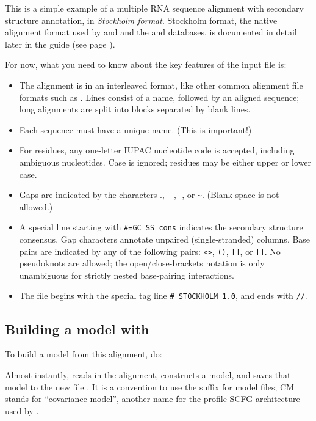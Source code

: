 This is a simple example of a multiple RNA sequence alignment with
secondary structure annotation, in \emph{Stockholm format}. Stockholm
format, the native alignment format used by  and
 and the  and 
databases, is documented in detail later in the guide (see page
\pageref{pg:stockholm}). 

For now, what you need to know about the key features of the input file is:
\begin{itemize}
\item The alignment is in an interleaved format, like other
common alignment file formats such as .
Lines consist of a name, followed by an aligned sequence;
long alignments are split into blocks separated by blank lines.
\item Each sequence must have a unique name. (This is important!)
\item For residues, any one-letter IUPAC nucleotide code is accepted,
      including ambiguous nucleotides. Case is ignored; residues
      may be either upper or lower case.
\item Gaps are indicated by the characters ., \_, -, or \verb+~+.
      (Blank space is not allowed.)
\item A special line starting with {\small\verb+#=GC SS_cons+} indicates
      the secondary structure consensus. Gap characters annotate
      unpaired (single-stranded) columns. Base pairs are indicated
      by any of the following pairs: \verb+<>+, \verb+()+, \verb+[]+,
      or \verb+[]+. No pseudoknots are allowed; the
      open/close-brackets notation is only unambiguous for strictly
      nested base-pairing interactions.
\item The file begins with the special tag line
      {\small\verb+# STOCKHOLM 1.0+}, and ends with {\small\verb+//+}.
\end{itemize}

\subsection{Building a model with }

To build a model from this alignment, do:


Almost instantly,  reads in the alignment, constructs a
model, and saves that model to the new file . It is a
convention to use the  suffix for model files; CM stands for
``covariance model'', another name for the profile SCFG architecture
used by  \cite{Eddy94}.

